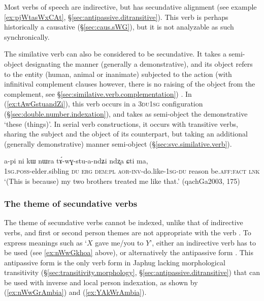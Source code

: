 Most verbs of speech are indirective, but  has secundative alignment (see example \ref{ex:pjWtasWxCAt}, §\ref{sec:antipassive.ditransitive}). This verb is perhaps historically a causative (§\ref{sec:caus.sWG}), but it is not analyzable as such synchronically. 

The similative verb  can also be considered to be secundative. It takes a semi-object designating the manner (generally a demonstrative), and its object refers to the entity (human, animal or inanimate) subjected to the action (with infinitival complement clauses however, there is no raising of the object from the complement, see §\ref{sec:similative.verb.complementation}) . In (\ref{ex:tAwGstuandZi}), this verb occurs in a \textsc{3du}\fl{}\textsc{1sg} configuration (§\ref{sec:double.number.indexation}), and takes as semi-object the demonstrative  `these (things)'. In serial verb constructions, it occurs with transitive verbs, sharing the subject and the object of its counterpart, but taking an additional (generally demonstrative) manner semi-object (§\ref{sec:svc.similative.verb}). 

\begin{exe}
	\ex \label{ex:tAwGstuandZi}
	\gll   a-pi ni kɯ nɯra tɤ́-wɣ-stu-a-ndʑi ndʐa ɕti ma, \\
	\textsc{1sg}.\textsc{poss}-elder.sibling \textsc{du} \textsc{erg} \textsc{dem}:\textsc{pl} \textsc{aor}-\textsc{inv}-do.like-\textsc{1sg}-\textsc{du} reason be.\textsc{aff}:\textsc{fact} \textsc{lnk} \\
	\glt `(This is because) my two brothers treated me like that.' (qachGa2003, 175)
\end{exe}


\subsubsection{The theme of secundative verbs} \label{sec:secundative.theme}
The theme of secundative verbs cannot be indexed, unlike that of indirective verbs, and first or second person themes are not appropriate with the verb . To express meanings such as `$X$ gave me/you to $Y$', either an indirective verb has to be used (see \ref{ex:nWwGkhoa} above), or alternatively the antipassive form . This antipassive form is the only verb form in Japhug lacking morphological transitivity (§\ref{sec:transitivity.morphology}, §\ref{sec:antipassive.ditransitive}) that can be used with inverse  and local person indexation, as shown by (\ref{ex:nWwGrAmbia}) and (\ref{ex:YAkWrAmbia}).

